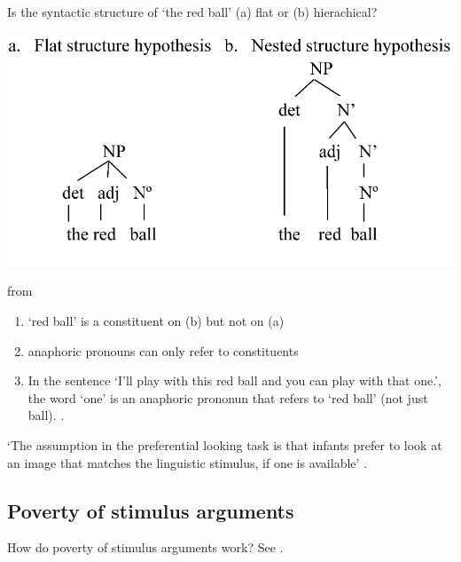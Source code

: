 \documentclass[12pt]{extarticle}
\begin{document}
\begin{multicols}{3}
Is the syntactic structure of ‘the red ball’ (a) flat or (b) hierachical?
 
\begin{center}
 
\includegraphics[scale=0.25]{../www.slides/src/raw/img/lidz_2003_fig0.neg.png}
 
\end{center}
 
\begin{center} from \citealp{lidz:2003_what} \end{center}
 
\begin{enumerate}
\item ‘red ball’ is a constituent on (b) but not on (a)
\item anaphoric pronouns can only refer to constituents
\item In the sentence ‘I’ll play with this red ball and you can play with that one.’, the word ‘one’ is an anaphoric prononun that refers to ‘red ball’ (not just ball). \citep{lidz:2003_what,lidz:2004_reaffirming}.
 
\end{enumerate}
 
‘The assumption in the preferential looking task is that infants prefer to look at an image that matches the linguistic stimulus, if one is available’ \citep{lidz:2003_what}.
 
\subsection{Poverty of stimulus arguments}
 
How do poverty of stimulus arguments work? See \citet{pullum:2002_empirical}.
 
\begin{enumerate}
 

\end{enumerate}
\end{multicols}
\end{document}
